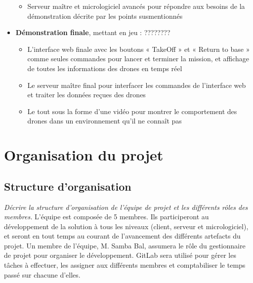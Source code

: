 \documentclass{mistcoursedoc}
\begin{document}
\begin{itemize}
\begin{itemize}
          \item Serveur maître et micrologiciel avancés pour répondre aux besoins de la démonstration décrite par les points susmentionnés
        \end{itemize}
  \item \textbf{Démonstration finale}, mettant en jeu : ????????
        \begin{itemize}
          \item L'interface web finale avec les boutons « TakeOff » et « Return to base » comme seules commandes pour lancer et terminer la mission, et affichage de toutes les informations des drones en temps réel
          \item Le serveur maître final pour interfacer les commandes de l'interface web et traiter les données reçues des drones
          \item Le tout sous la forme d'une vidéo pour montrer le comportement des drones dans un environnement qu'il ne connaît pas
        \end{itemize}
\end{itemize}

\section{Organisation du projet}

\subsection{Structure d’organisation}

\textit{Décrire la structure d’organisation de l’équipe de projet et les différents rôles des membres.}
L’équipe est composée de 5 membres. Ils participeront au développement de la solution à tous les niveaux (client, serveur et micrologiciel), et seront en tout temps au courant de l’avancement des différents artefacts du projet. Un membre de l'équipe, M. Samba Bal, assumera le rôle du gestionnaire de projet pour organiser le développement. GitLab sera utilisé pour gérer les tâches à effectuer, les assigner aux différents membres et comptabiliser le temps passé sur chacune d’elles.
\end{document}
